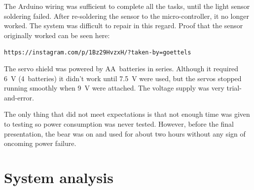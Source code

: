 \documentclass{article}
\begin{document}
The Arduino wiring was sufficient to complete all the tasks, until the light sensor soldering failed. After re-soldering the sensor to the micro-controller, it no longer worked. The system was difficult to repair in this regard. Proof that the sensor originally worked can be seen here:

\hfil\texttt{https://instagram.com/p/1Bz29HvzxH/?taken-by=goettels}\hfil

The servo shield was powered by AA~batteries in series. Although it required 6~V (4~batteries) it didn't work until 7.5~V were used, but the servos stopped running smoothly when 9~V were attached. The voltage supply was very trial-and-error.

The only thing that did not meet expectations is that not enough time was given to testing so power consumption was never tested. However, before the final presentation, the bear was on and used for about two hours without any sign of oncoming power failure.

\section{System analysis}
\end{document}
